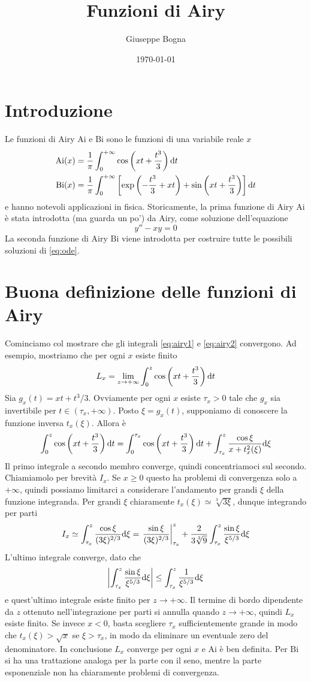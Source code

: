 \documentclass[11 pt]{article}
\title{Funzioni di Airy}
\author{Giuseppe Bogna}
\date{\today}
\newcommand{\ai}{\mathrm{Ai}}
\newcommand{\bi}{\mathrm{Bi}}
\begin{document}
	\maketitle
	\section*{Introduzione}
	Le funzioni di Airy $\ai$ e $\bi$ sono le funzioni di una variabile reale $x$
	\begin{align}
		\ai(x)&=\frac{1}{\pi}\int_{0}^{+\infty}\cos\left(xt+\frac{t^3}{3}\right)\d t\label{eq:airy1}\\\bi(x)&=\frac{1}{\pi}\int_{0}^{+\infty}\left[\exp\left(-\frac{t^3}{3}+xt\right)+\sin\left(xt+\frac{t^3}{3}\right)\right]\d t\label{eq:airy2}
	\end{align}
	e hanno notevoli applicazioni in fisica. Storicamente, la prima funzione di Airy $\ai$ è stata introdotta (ma guarda un po') da Airy, come soluzione dell'equazione
	\begin{equation}y''-xy=0\label{eq:ode}\end{equation}
	La seconda funzione di Airy $\bi$ viene introdotta per costruire tutte le possibili soluzioni di \ref{eq:ode}. 
	\section{Buona definizione delle funzioni di Airy}
	Cominciamo col mostrare che gli integrali \ref{eq:airy1} e \ref{eq:airy2} convergono. Ad esempio, mostriamo che per ogni $x$ esiste finito
	\[L_x=\lim\limits_{z\to+\infty}\int_{0}^{z}\cos\left(xt+\frac{t^3}{3}\right)\mathrm{d} t\]
	Sia $g_x(t)=xt+t^3/3$. Ovviamente per ogni $x$ esiste $\tau_x>0$ tale che $g_x$ sia invertibile per $t\in(\tau_x,+\infty)$. Posto $\xi=g_x(t)$, supponiamo di conoscere la funzione inversa $t_x(\xi)$. Allora è
	\[\int_{0}^{z}\cos\left(xt+\frac{t^3}{3}\right)\mathrm{d} t=\int_{0}^{\tau_x}\cos\left(xt+\frac{t^3}{3}\right)\mathrm{d} t+\int_{\tau_x}^{z}\frac{\cos\xi}{x+t^2_x(\xi)}\mathrm{d} \xi\]
	Il primo integrale a secondo membro converge, quindi concentriamoci sul secondo. Chiamiamolo per brevità $I_x$. Se $x\geq0$ questo ha problemi di convergenza solo a $+\infty$, quindi possiamo limitarci a considerare l'andamento per grandi $\xi$ della funzione integranda. Per grandi $\xi$ chiaramente $t_x(\xi)\simeq\sqrt[3]{3\xi}$, dunque integrando per parti
	\[I_{x}\simeq\int_{\tau_x}^{z}\frac{\cos\xi}{(3\xi)^{2/3}}\mathrm{d} \xi=\left.\frac{\sin\xi}{(3\xi)^{2/3}}\right|_{\tau_x}^{z}+\frac{2}{3\sqrt[3]{9}}\int_{\tau_x}^{z}\frac{\sin\xi}{\xi^{5/3}}\mathrm{d} \xi\]
	L'ultimo integrale converge, dato che
	\[\left|\int_{\tau_x}^{z}\frac{\sin\xi}{\xi^{5/3}}\mathrm{d} \xi\right|\leq\int_{\tau_x}^{z}\frac{1}{\xi^{5/3}}\mathrm{d} \xi\]
	e quest'ultimo integrale esiste finito per $z\to+\infty$. Il termine di bordo dipendente da $z$ ottenuto nell'integrazione per parti si annulla quando $z\to+\infty$, quindi $L_x$ esiste finito. Se invece $x<0$, basta scegliere $\tau_x$ sufficientemente grande in modo che $t_x(\xi)>\sqrt{x}$ se $\xi>\tau_x$, in modo da eliminare un eventuale zero del denominatore. In conclusione $L_x$ converge per ogni $x$ e $\ai$ è ben definita. Per $\bi$ si ha una trattazione analoga per la parte con il seno, mentre la parte esponenziale non ha chiaramente problemi di convergenza.
\end{document}
